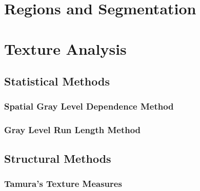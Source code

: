 \documentclass{article}
\begin{document}
\section{Regions and Segmentation}

\section{Texture Analysis}
\subsection{Statistical Methods}
\subsubsection{Spatial Gray Level Dependence Method}
\subsubsection{Gray Level Run Length Method}
\subsection{Structural Methods}
\subsubsection{Tamura's Texture Measures}



\end{document}
